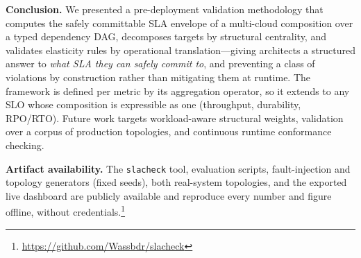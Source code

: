 \documentclass[conference]{IEEEtran}
\begin{document}
\textbf{Conclusion.} We presented a pre-deployment validation methodology that computes the safely committable SLA envelope of a multi-cloud composition over a typed dependency DAG, decomposes targets by structural centrality, and validates elasticity rules by operational translation---giving architects a structured answer to \emph{what SLA they can safely commit to}, and preventing a class of violations by construction rather than mitigating them at runtime. The framework is defined per metric by its aggregation operator, so it extends to any SLO whose composition is expressible as one (throughput, durability, RPO/RTO). Future work targets workload-aware structural weights, validation over a corpus of production topologies, and continuous runtime conformance checking.

\textbf{Artifact availability.} The \texttt{slacheck} tool, evaluation scripts, fault-injection and topology generators (fixed seeds), both real-system topologies, and the exported live dashboard are publicly available and reproduce every number and figure offline, without credentials.\footnote{\url{https://github.com/Wassbdr/slacheck}} %



\end{document}
